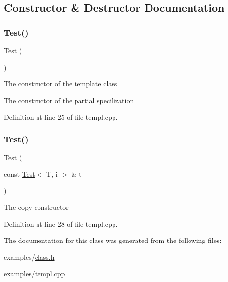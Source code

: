 \subsection{Constructor \& Destructor Documentation}
\mbox{\label{class_test_a350e5417b9f48c2f7b98937514b03da2}} 
\subsubsection{\texorpdfstring{Test()}{Test()}\hspace{0.1cm}{\footnotesize\ttfamily [1/2]}}
{\footnotesize\ttfamily \hyperlink{class_test}{Test} (\begin{DoxyParamCaption}{ }\end{DoxyParamCaption})}

The constructor of the template class

The constructor of the partial specilization 

Definition at line 25 of file templ.\+cpp.

\mbox{\label{class_test_ae2651dabc71308c432448f45a2738ace}} 
\subsubsection{\texorpdfstring{Test()}{Test()}\hspace{0.1cm}{\footnotesize\ttfamily [2/2]}}
{\footnotesize\ttfamily \hyperlink{class_test}{Test} (\begin{DoxyParamCaption}\item[{const \hyperlink{class_test}{Test}$<$ T, i $>$ \&}]{t }\end{DoxyParamCaption})}

The copy constructor 

Definition at line 28 of file templ.\+cpp.



The documentation for this class was generated from the following files\+:\begin{DoxyCompactItemize}
\item 
examples/\hyperlink{class_8h}{class.\+h}\item 
examples/\hyperlink{templ_8cpp}{templ.\+cpp}\end{DoxyCompactItemize}
